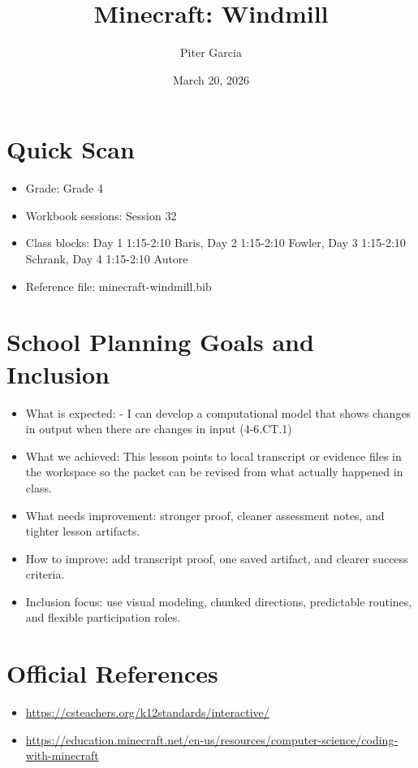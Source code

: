 \documentclass[11pt]{article}
\title{Minecraft: Windmill}
\author{Piter Garcia}
\date{March 20, 2026}
\begin{document}
    \maketitle
    \section*{Quick Scan}
    \begin{itemize}[leftmargin=*]
    \item Grade: Grade 4
    \item Workbook sessions: Session 32
    \item Class blocks: Day 1 1:15-2:10 Baris, Day 2 1:15-2:10 Fowler, Day 3 1:15-2:10 Schrank, Day 4 1:15-2:10 Autore
    \item Reference file: minecraft-windmill.bib
    \end{itemize}
    \section*{School Planning Goals and Inclusion}
    \begin{itemize}[leftmargin=*]
    \item What is expected: - I can develop a computational model that shows changes in output when there are changes in input (4-6.CT.1)
    \item What we achieved: This lesson points to local transcript or evidence files in the workspace so the packet can be revised from what actually happened in class.
    \item What needs improvement: stronger proof, cleaner assessment notes, and tighter lesson artifacts.
    \item How to improve: add transcript proof, one saved artifact, and clearer success criteria.
    \item Inclusion focus: use visual modeling, chunked directions, predictable routines, and flexible participation roles.
    \end{itemize}
    \section*{Official References}
    \begin{itemize}[leftmargin=*]
    \item \url{https://csteachers.org/k12standards/interactive/}
\item \url{https://education.minecraft.net/en-us/resources/computer-science/coding-with-minecraft}

    \end{itemize}
    
\end{document}
